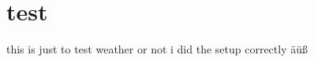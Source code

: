 %



%
%
%
\cleardoublepage
{}
\setcounter{page}{0}
\tableofcontents
\clearpage

%
%
%
\cleardoublepage
{}
\setcounter{page}{0}
\section{test}
this is just to test weather or not i did the setup correctly
äüß


 \cleardoublepage
 

